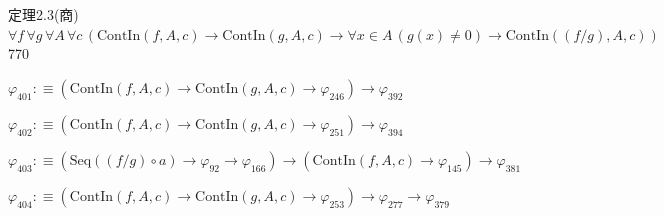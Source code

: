 \begin{fullproof}{定理2.3(商)}{$\forall f\,\forall g\,\forall A\,\forall c\,(\mathrm{ContIn}(f,A,c) \to \mathrm{ContIn}(g,A,c) \to \forall x \in A\,(g(x) \neq 0) \to \mathrm{ContIn}((f / g),A,c))$}{770}
\begin{abbrevlist}
\item $\varphi_{401} :\equiv (\mathrm{ContIn}(f,A,c) \to \mathrm{ContIn}(g,A,c) \to \varphi_{246}) \to \varphi_{392}$
\item $\varphi_{402} :\equiv (\mathrm{ContIn}(f,A,c) \to \mathrm{ContIn}(g,A,c) \to \varphi_{251}) \to \varphi_{394}$
\item $\varphi_{403} :\equiv (\mathrm{Seq}((f / g) \circ a) \to \varphi_{92} \to \varphi_{166}) \to (\mathrm{ContIn}(f,A,c) \to \varphi_{145}) \to \varphi_{381}$
\item $\varphi_{404} :\equiv (\mathrm{ContIn}(f,A,c) \to \mathrm{ContIn}(g,A,c) \to \varphi_{253}) \to \varphi_{277} \to \varphi_{379}$
\end{abbrevlist}
\end{fullproof}
